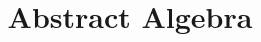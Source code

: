 \documentclass[11pt, oneside]{amsart}
\begin{document}
\title{Abstract Algebra}
\maketitle


\clearpage

\clearpage

\clearpage

\clearpage


\end{document}
